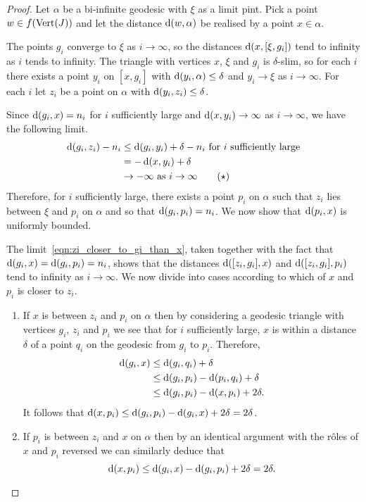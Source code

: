 \documentclass[a4paper]{article}
\begin{document}
\begin{proof}
  Let $\alpha$ be a bi-infinite geodesic with $\xi$ as a limit pint. Pick a
  point $w \in f(\operatorname{Vert}(J))$ and let the distance $\operatorname{d}(w,\alpha)$ be
  realised by a point $x \in \alpha$.

  The points $g_i$ converge to $\xi$ as $i\to\infty$, so the distances
  $\operatorname{d}(x, [\xi, g_i])$ tend to infinity as $i$ tends to infinity. The
  triangle with vertices $x$, $\xi$ and $g_i$ is $\delta$-slim, so for each $i$
  there exists a point $y_i$ on $[x, g_i]$ with $\operatorname{d}(y_i, \alpha) \leq
  \delta$ and $y_i\to\xi$ as $i\to\infty$.  For each $i$ let $z_i$ be a point
  on $\alpha$ with $\operatorname{d}(y_i, z_i) \leq \delta$.

  Since $\operatorname{d}(g_i, x) = n_i$ for $i$ sufficiently large and $\operatorname{d}(x,y_i) \to
  \infty$ as $i\to\infty$, we have the following limit.
  \begin{align*}\label{eqn:zi_closer_to_gi_than_x}
    \operatorname{d}(g_i,z_i) - n_i &\leq \operatorname{d}(g_i,y_i) + \delta - n_i \text{ for $i$
                                        sufficiently large} \\
                         &= - \operatorname{d}(x,y_i) + \delta \\
                         &\to -\infty\text{ as $i \to \infty$} \tag{$\star$}
  \end{align*}
  Therefore, for $i$ sufficiently large, there exists a point $p_i$ on $\alpha$
  such that $z_i$ lies between $\xi$ and $p_i$ on $\alpha$ and so that
  $\operatorname{d}(g_i,p_i)=n_i$. We now show that $\operatorname{d}(p_i, x)$ is uniformly bounded.

  The limit~\eqref{eqn:zi_closer_to_gi_than_x}, taken together with the fact
  that $\operatorname{d}(g_i, x) = \operatorname{d}(g_i, p_i) = n_i$, shows that the distances
  $\operatorname{d}([z_i, g_i], x)$ and $\operatorname{d}([z_i, g_i], p_i)$ tend to infinity as
  $i\to\infty$.  We now divide into cases according to which of $x$ and $p_i$
  is closer to $z_i$.
  \begin{enumerate}
    \item If $x$ is between $z_i$ and $p_i$ on $\alpha$ then by considering a
      geodesic triangle with vertices $g_i$, $z_i$ and $p_i$ we see that for
      $i$ sufficiently large, $x$ is within a distance $\delta$ of a point
      $q_i$ on the geodesic from $g_i$ to $p_i$.  Therefore,
      \begin{align*}
        \operatorname{d}(g_i,x)&\leq \operatorname{d}(g_i,q_i)+\delta\\
                        &\leq \operatorname{d}(g_i,p_i)-\operatorname{d}(p_i,q_i)+\delta\\
                        &\leq \operatorname{d}(g_i,p_i)-\operatorname{d}(x,p_i)+2\delta.
      \end{align*}
      It follows that $\operatorname{d}(x,p_i) \leq \operatorname{d}(g_i,p_i)-\operatorname{d}(g_i,x)+2\delta
      = 2\delta$.
    \item If $p_i$ is between $z_i$ and $x$ on $\alpha$ then by an identical 
      argument with the r\^oles of $x$ and $p_i$ reversed we can similarly 
      deduce that 
      \begin{equation*}
        \operatorname{d}(x,p_i)\leq\operatorname{d}(g_i,x) - \operatorname{d}(g_i,p_i) + 2\delta =2\delta.
      \end{equation*}
  \end{enumerate}


\end{proof}
\end{document}
